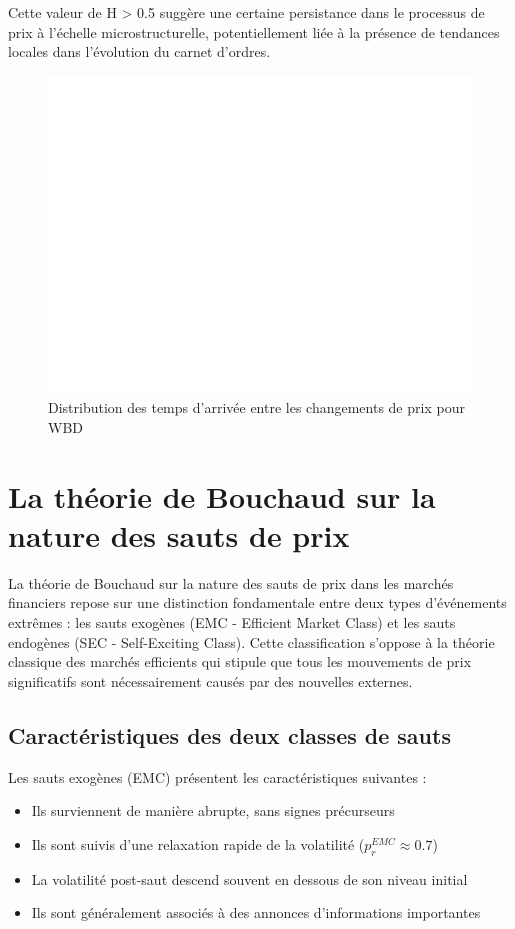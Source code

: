 \documentclass[12pt,a4paper]{article}
\theoremstyle{definition}
\theoremstyle{remark}
\begin{document}
Cette valeur de H > 0.5 suggère une certaine persistance dans le processus de prix à l'échelle microstructurelle, potentiellement liée à la présence de tendances locales dans l'évolution du carnet d'ordres.

\begin{figure}[h!]
    \centering
    \includegraphics[width=\textwidth]{results/hurst/plots/WBD/WBD_arrival_times.png}
    \caption{Distribution des temps d'arrivée entre les changements de prix pour WBD}
    \label{fig:arrival_times}
\end{figure}

\section{La théorie de Bouchaud sur la nature des sauts de prix}

La théorie de Bouchaud sur la nature des sauts de prix dans les marchés financiers repose sur une distinction fondamentale entre deux types d'événements extrêmes : les sauts exogènes (EMC - Efficient Market Class) et les sauts endogènes (SEC - Self-Exciting Class). Cette classification s'oppose à la théorie classique des marchés efficients qui stipule que tous les mouvements de prix significatifs sont nécessairement causés par des nouvelles externes.

\subsection{Caractéristiques des deux classes de sauts}

Les sauts exogènes (EMC) présentent les caractéristiques suivantes :
\begin{itemize}
    \item Ils surviennent de manière abrupte, sans signes précurseurs
    \item Ils sont suivis d'une relaxation rapide de la volatilité ($p_r^{EMC} \approx 0.7$)
    \item La volatilité post-saut descend souvent en dessous de son niveau initial
    \item Ils sont généralement associés à des annonces d'informations importantes
\end{itemize}
\end{document}
